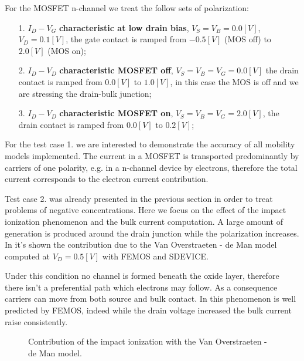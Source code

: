 For the MOSFET n-channel we treat the follow sets of polarization:
\begin{itemize}
\item[1.] $I_D-V_G$ {\bf characteristic at low drain bias},  $V_S=V_B=0.0[V]$, $V_D=0.1[V]$, the gate contact is ramped from $-0.5[V]$ (MOS off) to $2.0[V]$ (MOS on);
\item[2.] $I_D-V_D$ {\bf characteristic MOSFET off}, $V_S=V_B=V_G=0.0[V]$ the drain contact is ramped from $0.0[V]$ to $1.0[V]$, in this case the MOS is off and we are stressing the drain-bulk junction;
\item[3.] $I_D-V_D$ {\bf characteristic MOSFET on}, $V_S=V_B=V_G=2.0[V]$, the drain contact is ramped from $0.0[V]$ to $0.2[V]$;
\end{itemize}

For the test case 1. we are interested to demonstrate the accuracy of all mobility models implemented. The current in a MOSFET is transported predominantly by carriers of one polarity, e.g. in a n-channel device by electrons, therefore the total current corresponds to the electron current contribution. 

\begin{figure}[!h]
\end{figure}


\clearpage

Test case 2. was already presented in the previous section in order to treat problems of negative concentrations. Here we focus on the effect of the impact ionization phenomenon and the bulk current computation. A large amount of generation is produced around the drain junction while the polarization increases. In  it's shown the contribution due to the Van Overstraeten - de Man model computed at $V_D = 0.5 [V]$ with FEMOS and SDEVICE. 

Under this condition no channel is formed beneath the oxide layer, therefore there isn't a preferential path which electrons may follow. As a consequence carriers can move from both source and bulk contact. In  this phenomenon is well predicted by FEMOS, indeed while the drain voltage increased the bulk current raise consistently.


\begin{figure}[!h]
\centering
{}
\hspace{1cm}
\caption{Contribution of the impact ionization with the Van Overstraeten - de Man model.}
\label{fig: II MOS}
\end{figure}

